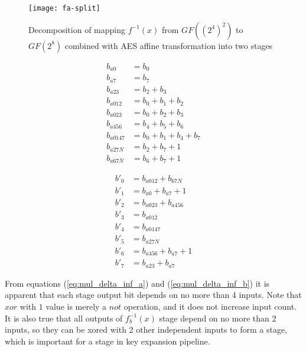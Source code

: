 \begin{figure}[!h]
\centering
\texttt{[image: fa-split]}
\caption{Decomposition of mapping $f^{-1}(x)$ from $GF((2^4)^2)$ to $GF(2^8)$ combined with AES affine transformation into two stages}
\label{fig:fa-split}
\end{figure}


\begin{equation}
\label{eq:mul_delta_inf_a}
\begin{aligned}
b_{a0}    &= b_0                    \\
b_{a7}    &= b_7                    \\
b_{a23}   &= b_2 + b_3              \\
b_{a012}  &= b_0 + b_1 + b_2        \\
b_{a023}  &= b_0 + b_2 + b_3        \\
b_{a456}  &= b_4 + b_5 + b_6        \\
b_{a0147} &= b_0 + b_1 + b_4 + b_7  \\
b_{a27N}  &= b_2 + b_7 + 1          \\
b_{a67N}  &= b_6 + b_7 + 1            
\end{aligned}
\end{equation}

\begin{equation}
\label{eq:mul_delta_inf_b}
\begin{aligned}
b'_0 &= b_{a012} + b_{67N}           \\
b'_1 &= b_{a0} + b_{a7} + 1          \\
b'_2 &= b_{a023} + b_{a456}          \\
b'_3 &= b_{a012}                     \\
b'_4 &= b_{a0147}                    \\
b'_5 &= b_{a27N}                     \\
b'_6 &= b_{a456} + b_{a7} + 1        \\
b'_7 &= b_{a23} + b_{a7}                    
\end{aligned}
\end{equation}

From equations (\ref{eq:mul_delta_inf_a}) and (\ref{eq:mul_delta_inf_b}) it is apparent that each stage output bit depends on no more than 4 inputs. Note that $xor$ with $1$ value is merely a $not$ operation, and it does not increase input count. It is also true that all outputs of $f_b^{-1}(x)$ stage depend on no more than 2 inputs, so they can be xored with 2 other independent inputs to form a stage, which is important for a stage in key expansion pipeline.




